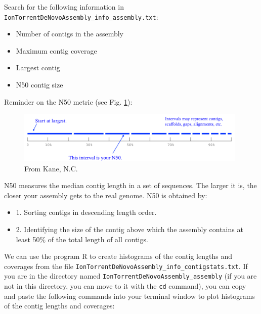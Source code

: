 \documentclass[11pt]{article}
\begin{document}
Search for the following information in \texttt{IonTorrentDeNovoAssembly\_info\_assembly.txt}:
\begin{itemize}
\item Number of contigs in the assembly
\item Maximum contig coverage
\item Largest contig
\item N50 contig size
\end{itemize}

Reminder on the N50 metric (see Fig. \ref{fig:N50}):


\begin{figure}[htb]
\centering
\includegraphics[width=11cm]{N50.png}
\caption{\label{fig:N50}From Kane, N.C.}
\end{figure}


N50 measures the median contig length in a set of sequences. The
larger it is, the closer your assembly gets to the real genome. N50 is
obtained by:
\begin{itemize}
\item 1. Sorting contigs in descending length order.
\item 2. Identifying the size of the contig above which the assembly contains at least 50\% of the
total length of all contigs.
\end{itemize}


We can use the program R to create histograms of the contig lengths
and coverages from the file
\texttt{IonTorrentDeNovoAssembly\_info\_contigstats.txt}. If you are in the
directory named \texttt{IonTorrentDeNovoAssembly\_assembly} (if you are not in
this directory, you can move to it with the \texttt{cd} command), you can
copy and paste the following commands into your terminal window to
plot histograms of the contig lengths and coverages:
\end{document}
